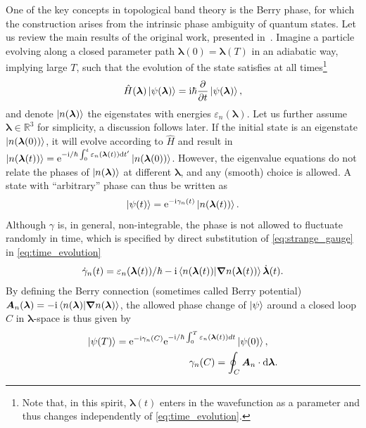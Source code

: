 One of the key concepts in topological band theory is the Berry phase, for which the construction arises from the intrinsic phase ambiguity of quantum states.
Let us review the main results of the original work, presented in~\cite{Berry1984}.
Imagine a particle evolving along a closed parameter path ${\bm \lambda}(0)={\bm \lambda}(T)$ in an adiabatic way, implying large $T$, such that the evolution of the state satisfies at all times\footnote{Note that, in this spirit, $\bm \lambda(t)$ enters in the wavefunction as a parameter and thus changes independently of \cref{eq:time_evolution}.}
\begin{align}
    \hat H(\bm \lambda)\ket{\psi(\bm \lambda)} = \mathrm i\hbar\frac{\partial}{\partial t}\ket{\psi({\bm \lambda})},
    \label{eq:time_evolution}
\end{align}
and denote $\ket{n(\bm \lambda)}$ the eigenstates with energies $\varepsilon_n(\bm \lambda)$.
Let us further assume $\bm \lambda\in\mathds R^3$ for simplicity, a discussion follows later.
If the initial state is an eigenstate $\ket{n(\bm \lambda(0))}$, it will evolve according to $\hat H$ and result in $\ket{n(\bm \lambda(t))}=\mathrm e^{-\mathrm i/\hbar\int_0^t \varepsilon_n(\bm \lambda(t))\mathrm d t'}\ket{n(\bm \lambda(0))}$.
However, the eigenvalue equations do not relate the phases of $\ket{n(\bm \lambda)}$ at different $\bm \lambda$, and any (smooth) choice is allowed.
A state with ``arbitrary'' phase can thus be written as
\begin{align}
    \ket{\psi(t)} = \mathrm e^{-\mathrm i\gamma_n(t)}\ket{n(\bm \lambda(t))}.
    \label{eq:strange_gauge}
\end{align}
Although $\gamma$ is, in general, non-integrable, the phase is not allowed to fluctuate randomly in time, which is specified by direct substitution of \cref{eq:strange_gauge} in \cref{eq:time_evolution}
\begin{align}
    \dot\gamma_n(t) = \varepsilon_n(\bm \lambda(t))/\hbar -\mathrm i \braket{n({\bm \lambda(t)})|\bm\nabla n({\bm \lambda(t)})} \dot{\bm \lambda}(t).
    \label{eq:phase_evolution}
\end{align}
By defining the Berry connection (sometimes called Berry potential) $\bm A_n(\bm \lambda) = -\mathrm i \braket{n(\bm \lambda)|\bm\nabla n(\bm \lambda)}$, the allowed phase change of $\ket\psi$ around a closed loop $C$ in $\bm \lambda$-space is thus given by
\begin{align}
    \ket{\psi(T)} = \mathrm e^{-\mathrm i \gamma_n(C)}\mathrm e^{-\mathrm i/\hbar\int_0^T\varepsilon_n(\bm \lambda(t))dt}\ket{\psi(0)}
    ,\quad
    \\
    \gamma_n(C) = \oint_C{\bm A_n}\cdot\mathrm d \bm \lambda.
    \label{eq:phase_change}
\end{align}
